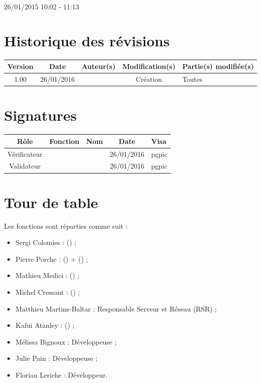 \documentclass [a4paper] {article}
\begin{document}
26/01/2015			 				%
\hfill   
\hfill 	 10:02 - 11:13 				%


\section*{Historique des révisions}
\begin{center}
			\begin{tabular}{| c | c | c | c | p{4cm} |}
				\hline
				\rowcolor{Gray}
				Version & Date & Auteur(s) & Modification(s) & Partie(s) modifiée(s)		 \\
				\hline
				1.00 & 26/01/2016 & \Pierre & Création & Toutes \\
		\hline		
			\end{tabular}
		\end{center}

\section*{Signatures}

		\begin{center}
			\begin{tabular}{| c | c | c | c | p{4cm} |}
				\hline
				\rowcolor{Gray}
				Rôle & Fonction & Nom & Date & Visa		 \\
				\hline
				Vérificateur & \RQA & \Kafui & 26/01/2016 & pgpic \\[30pt]
				\hline
				Validateur & \CP & \Sergi & 26/01/2016 & pgpic \\[30pt]	
				\hline
			\end{tabular}
		\end{center}


\section{Tour de table}
Les fonctions sont réparties comme suit :
\begin{itemize}
	\item Sergi Colomies : \CP (\CPCourt) ;
	\item Pierre Porche : \RQ (\RQCourt) + \CPA (\CPACourt) ;
	\item Mathieu Medici : \RGC (\RGCCourt) ;
	\item Michel Cressant : \RD (\RDCourt) ;
	\item Matthieu Martins-Baltar : Responsable Serveur et Réseau (RSR) ;
	\item Kafui Atanley : \RQA (\RQACourt) ;
	\item Mélissa Bignoux : Développeuse ;
	\item Julie Pain : Développeuse ;
	\item Florian Leriche : Développeur.


\end{itemize}
\end{document}
